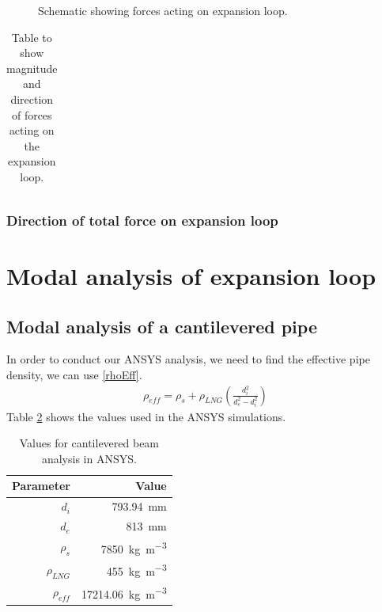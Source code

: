 \begin{figure}[H]
    \centering
    \caption{Schematic showing forces acting on expansion loop.}
    \label{force3}
\end{figure}

\begin{table}[H]
    \centering
    \begin{tabular}{@{}llll@{}}
    \end{tabular}
    \caption{Table to show magnitude and direction of forces acting on the expansion loop.}
    \label{force4}
\end{table}

\subsubsection{Direction of total force on expansion loop}
\section{Modal analysis of expansion loop}
\subsection{Modal analysis of a cantilevered pipe}
In order to conduct our ANSYS analysis, we need to find the effective pipe density, we can use \eqref{rhoEff}.
\begin{gather}\label{rhoEff}
    \rho_{eff} = \rho_s + \rho_{LNG}\left(\frac{d_i^2}{d_e^2 - d_i^2}\right)
\end{gather}
Table \ref{modalParams} shows the values used in the ANSYS simulations.
\begin{table}[H]
    \centering
    \begin{tabular}{@{}rr@{}}
        \toprule
        \textbf{Parameter} & \textbf{Value}                            \\
        \midrule
        $d_i$              & \SI{793.94}{\milli\meter}                 \\
        $d_e$              & \SI{813}{\milli\meter}                    \\
        $\rho_s$           & \SI{7850}{\kilo\gram\per\meter\cubed}     \\
        $\rho_{LNG}$       & \SI{455}{\kilo\gram\per\meter\cubed}      \\
        $\rho_{eff}$       & \SI{17214.06}{\kilo\gram\per\meter\cubed} \\
        \bottomrule
    \end{tabular}
    \caption{Values for cantilevered beam analysis in ANSYS.}
    \label{modalParams}
\end{table}
